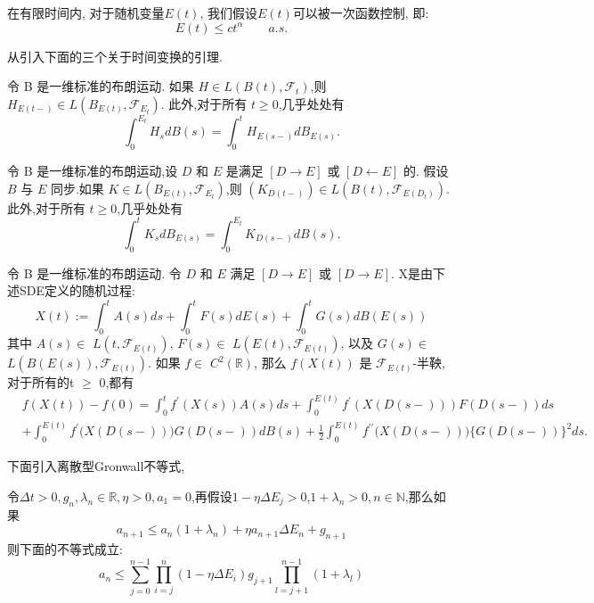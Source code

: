 \begin{assumption}\label{ebound}
	在有限时间内, 对于随机变量$E(t)$, 我们假设$E(t)$可以被一次函数控制, 即:
	\begin{equation}
	E(t) \leq ct^{\alpha} \qquad a.s.
	\end{equation}
	
\end{assumption}

从\cite{umarov2018beyond}引入下面的三个关于时间变换的引理.
\begin{lemma}[第一变量变换公式]\label{first}
	令 B 是一维标准的布朗运动.
	如果 $H \in L(B(t), \mathcal{F}_t)$,则 $H_{E(t-)} \in L(B_{E(t)}, \mathcal{F}_{E_t})$.
	此外,对于所有 $t \geqslant 0$,几乎处处有
	$$
	\int_0^{E_t} H_s dB(s) = \int_0^t H_{E(s-)} dB_{E(s)}.
	$$
\end{lemma}
\begin{lemma}[第二变量变换公式]\label{second}
	令 B 是一维标准的布朗运动,设 $D$ 和 $E$ 是满足 $[D \longrightarrow E]$ 或 $[D \longleftarrow E]$ 的.
	假设 $B$ 与 $E$ 同步.如果 $K \in L(B_{E(t)}, \mathcal{F}_{E_t})$,则 $(K_{D(t-)}) \in L(B(t), \mathcal{F}_{E(D_t)})$.
	此外,对于所有 $t \geqslant 0$,几乎处处有
	$$
	\int_0^t K_s dB_{E(s)} = \int_0^{E_t} K_{D(s-)} dB(s).
	$$
\end{lemma}

\begin{lemma}[It\^{o}公式]\label{ito}
	令 B 是一维标准的布朗运动. 令 $D$ 和 $E$ 满足 $[  D\longrightarrow E ]$ 或 $[  D\longrightarrow E ] .$ X是由下述SDE定义的随机过程:
	$$X(t):=\int_0^tA(s)ds+\int_0^tF(s)dE(s)+\int_0^tG(s)dB(E(s))$$
	其中 $A(s)\in$ $L( t, \mathcal{F} _{E(t)})$, $F(s)\in$ $L( E(t), \mathcal{F} _{E(t)})$, 以及 $G(s)\in$ $L( B(E(s)), \mathcal{F} _{E(t)}) .$ 如果 $f\in$ $C^2( \mathbb{R} )$, 那么
	$f(X(t))$ 是 $\mathcal{F}_{E(t)}$-半鞅, 对于所有的t $\ge$ 0,都有
	$$\begin{aligned}
		&f(X(t))-f(0)=\int_{0}^{t}f^{\prime}(X(s))A(s)ds+\int_{0}^{E(t)}f^{\prime}\left(X(D(s-))\right)F(D(s-))ds\\
		&+\int_{0}^{E(t)}f^{\prime}\big(X(D(s-))\big)G(D(s-))dB(s)+\frac{1}{2}\int_{0}^{E(t)}f^{\prime\prime}\big(X(D(s-))\big)\big\{G(D(s-))\big\}^{2}ds.
	\end{aligned}$$
\end{lemma}

下面引入离散型Gronwall不等式, 
\begin{lemma}\label{gronwall}
	令$\Delta t > 0,g_n,\lambda _n \in \mathbb{R},\eta > 0,a_1=0$,再假设$1-\eta \Delta E_j > 0$,$1 + \lambda _n > 0,n \in \mathbb{N}$,那么如果
	\begin{equation*}
		a_{n+1} \leq a_n(1+\lambda _n)+\eta a_{n+1}\Delta E_n +g_{n+1}
	\end{equation*}
	则下面的不等式成立:
	\begin{equation}
		a_n \leq \sum\limits_{j=0}^{n-1}\prod_{i=j}^{n}(1-\eta\Delta E_i)g_{j+1}\prod\limits_{l=j+1}^{n-1}(1+\lambda _l)
	\end{equation}
\end{lemma}

